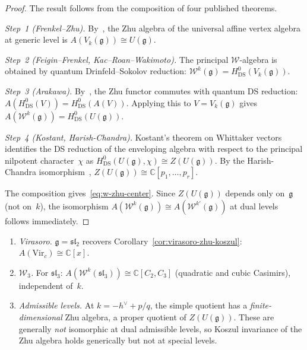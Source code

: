 \begin{proof}
The result follows from the composition of four published theorems.

\emph{Step~1 (Frenkel--Zhu).}
By~\cite{FZ92}, the Zhu algebra of the universal affine vertex algebra at
generic level is $A(V_k(\mathfrak{g})) \cong U(\mathfrak{g})$.

\emph{Step~2 (Feigin--Frenkel, Kac--Roan--Wakimoto).}
The principal $\mathcal{W}$-algebra is obtained by quantum Drinfeld--Sokolov
reduction: $\mathcal{W}^k(\mathfrak{g}) = H^0_{\mathrm{DS}}(V_k(\mathfrak{g}))$.

\emph{Step~3 (Arakawa).}
By~\cite{Ara07}, the Zhu functor commutes with quantum DS reduction:
$A(H^0_{\mathrm{DS}}(V)) = H^0_{\mathrm{DS}}(A(V))$.
Applying this to $V = V_k(\mathfrak{g})$ gives
$A(\mathcal{W}^k(\mathfrak{g})) = H^0_{\mathrm{DS}}(U(\mathfrak{g}))$.

\emph{Step~4 (Kostant, Harish-Chandra).}
Kostant's theorem on Whittaker vectors~\cite{Kostant78} identifies
the DS reduction of the enveloping algebra with respect to the
principal nilpotent character~$\chi$ as
$H^0_{\mathrm{DS}}(U(\mathfrak{g}), \chi) \cong Z(U(\mathfrak{g}))$.
By the Harish-Chandra isomorphism~\cite{HarishChandra},
$Z(U(\mathfrak{g})) \cong \mathbb{C}[p_1, \ldots, p_r]$.

The composition gives~\eqref{eq:w-zhu-center}. Since
$Z(U(\mathfrak{g}))$ depends only on~$\mathfrak{g}$ (not on~$k$), the
isomorphism $A(\mathcal{W}^k(\mathfrak{g})) \cong A(\mathcal{W}^{k'}(\mathfrak{g}))$
at dual levels follows immediately.
\end{proof}

\begin{remark}\label{rem:zhu-w-algebras-explicit}
\leavevmode
\begin{enumerate}[label=(\roman*)]
\item \emph{Virasoro.} $\mathfrak{g} = \mathfrak{sl}_2$ recovers Corollary~\ref{cor:virasoro-zhu-koszul}: $A(\mathrm{Vir}_c) \cong \mathbb{C}[x]$.
\item \emph{$\mathcal{W}_3$.} For $\mathfrak{sl}_3$: $A(\mathcal{W}^k(\mathfrak{sl}_3)) \cong \mathbb{C}[C_2, C_3]$ (quadratic and cubic Casimirs), independent of~$k$.
\item \emph{Admissible levels.} At $k = -h^\vee + p/q$, the simple quotient has a \emph{finite-dimensional} Zhu algebra, a proper quotient of $Z(U(\mathfrak{g}))$. These are generally \emph{not} isomorphic at dual admissible levels, so Koszul invariance of the Zhu algebra holds generically but not at special levels.
\end{enumerate}
\end{remark}

